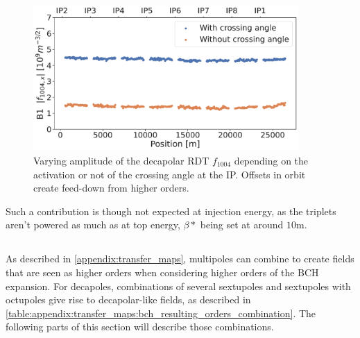 \begin{figure}[!htb]
    \centering
    \includegraphics[width=0.9\textwidth]{./images/f1004x_feed-down_b6_triplets.pdf}
    \caption{Varying amplitude of the decapolar RDT $f_{1004}$ depending on the activation or not of
    the crossing angle at the IP. Offsets in orbit create feed-down from higher orders.}
    \label{fig:decapoles:f1004_from_feeddown}
\end{figure}

Such a contribution is though not expected at injection energy, as the triplets aren't powered as
much as at top energy, $\beta*$ being set at around $10$m.

\subsection{}


\subsubsection{}

As described in \cref{appendix:transfer_maps}, multipoles can combine to create fields that are seen
as higher orders when considering higher orders of the BCH expansion.
For decapoles, combinations of several sextupoles and sextupoles with octupoles give rise to
decapolar-like fields, as described in
\cref{table:appendix:transfer_maps:bch_resulting_orders_combination}. The following parts of this
section will describe those combinations.

